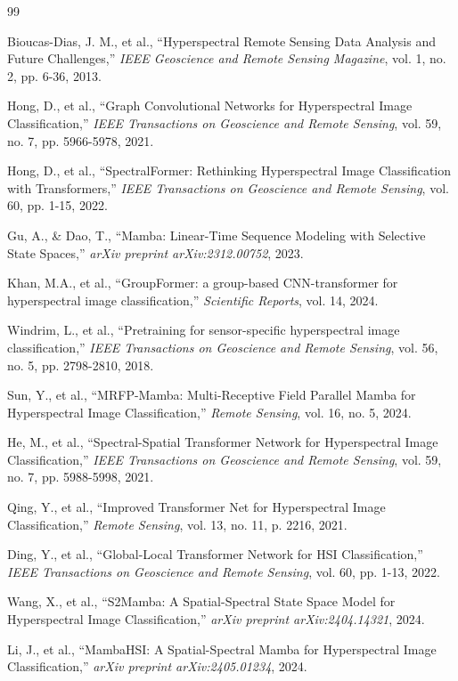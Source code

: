 \documentclass[pdflatex,sn-mathphys-num,iicol]{sn-jnl}
\begin{document}
\begin{thebibliography}{99}

Bioucas-Dias, J. M., et al., ``Hyperspectral Remote Sensing Data Analysis and Future Challenges,'' \textit{IEEE Geoscience and Remote Sensing Magazine}, vol. 1, no. 2, pp. 6-36, 2013.

Hong, D., et al., ``Graph Convolutional Networks for Hyperspectral Image Classification,'' \textit{IEEE Transactions on Geoscience and Remote Sensing}, vol. 59, no. 7, pp. 5966-5978, 2021.

Hong, D., et al., ``SpectralFormer: Rethinking Hyperspectral Image Classification with Transformers,'' \textit{IEEE Transactions on Geoscience and Remote Sensing}, vol. 60, pp. 1-15, 2022.

Gu, A., \& Dao, T., ``Mamba: Linear-Time Sequence Modeling with Selective State Spaces,'' \textit{arXiv preprint arXiv:2312.00752}, 2023.

Khan, M.A., et al., ``GroupFormer: a group-based CNN-transformer for hyperspectral image classification,'' \textit{Scientific Reports}, vol. 14, 2024.

Windrim, L., et al., ``Pretraining for sensor-specific hyperspectral image classification,'' \textit{IEEE Transactions on Geoscience and Remote Sensing}, vol. 56, no. 5, pp. 2798-2810, 2018.

Sun, Y., et al., ``MRFP-Mamba: Multi-Receptive Field Parallel Mamba for Hyperspectral Image Classification,'' \textit{Remote Sensing}, vol. 16, no. 5, 2024.

He, M., et al., ``Spectral-Spatial Transformer Network for Hyperspectral Image Classification,'' \textit{IEEE Transactions on Geoscience and Remote Sensing}, vol. 59, no. 7, pp. 5988-5998, 2021.

Qing, Y., et al., ``Improved Transformer Net for Hyperspectral Image Classification,'' \textit{Remote Sensing}, vol. 13, no. 11, p. 2216, 2021.

Ding, Y., et al., ``Global-Local Transformer Network for HSI Classification,'' \textit{IEEE Transactions on Geoscience and Remote Sensing}, vol. 60, pp. 1-13, 2022.

Wang, X., et al., ``S2Mamba: A Spatial-Spectral State Space Model for Hyperspectral Image Classification,'' \textit{arXiv preprint arXiv:2404.14321}, 2024.

Li, J., et al., ``MambaHSI: A Spatial-Spectral Mamba for Hyperspectral Image Classification,'' \textit{arXiv preprint arXiv:2405.01234}, 2024.


\end{thebibliography}
\end{document}
